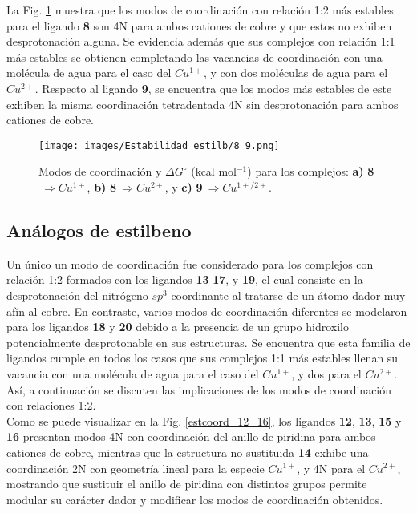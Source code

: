 La Fig. \ref{estcoord_8_9} muestra que los modos de coordinación con relación 1:2 más estables para el ligando \textbf{8} son 4N para ambos cationes de cobre y que estos no exhiben desprotonación alguna. Se evidencia además que sus complejos con relación 1:1 más estables se obtienen completando las vacancias de coordinación con una molécula de agua para el caso del $Cu^{1+}$, y con dos moléculas de agua para el $Cu^{2+}$. Respecto al ligando \textbf{9}, se encuentra que los modos más estables de este exhiben la misma coordinación tetradentada 4N sin desprotonación para ambos cationes de cobre.

\hspace{0cm}
\vfill
\begin{figure}[ht] 
\centering
\texttt{[image: images/Estabilidad\_estilb/8\_9.png]}
\caption{Modos de coordinación y $\Delta G^{\circ}$ (kcal mol$^{-1}$) para los complejos: \textbf{a)} \textbf{8}$\ \Rightarrow Cu^{1+}$, \textbf{b)} \textbf{8}$\ \Rightarrow Cu^{2+}$, y \textbf{c)} \textbf{9}$\ \Rightarrow Cu^{1+/2+}$.}\label{estcoord_8_9}
\end{figure}
\vfill
\hspace{0cm}

\clearpage

\subsection{Análogos de estilbeno}

Un único un modo de coordinación fue considerado para los complejos con relación 1:2 formados con los ligandos \textbf{13}-\textbf{17}, y \textbf{19}, el cual consiste en la desprotonación del nitrógeno $sp^{3}$ coordinante al tratarse de un átomo dador muy afín al cobre. En contraste, varios modos de coordinación diferentes se modelaron para los ligandos \textbf{18} y \textbf{20} debido a la presencia de un grupo hidroxilo potencialmente desprotonable en sus estructuras. Se encuentra que esta familia de ligandos cumple en todos los casos que sus complejos 1:1 más estables llenan su vacancia con una molécula de agua para el caso del $Cu^{1+}$, y dos para el $Cu^{2+}$. Así, a continuación se discuten las implicaciones de los modos de coordinación con relaciones 1:2.\\

Como se puede visualizar en la Fig. \ref{estcoord_12_16}, los ligandos \textbf{12}, \textbf{13}, \textbf{15} y \textbf{16} presentan modos 4N con coordinación del anillo de piridina para ambos cationes de cobre, mientras que la estructura no sustituida \textbf{14} exhibe una coordinación 2N con geometría lineal para la especie $Cu^{1+}$, y 4N para el $Cu^{2+}$, mostrando que sustituir el anillo de piridina con distintos grupos permite modular su carácter dador y modificar los modos de coordinación obtenidos.\\

